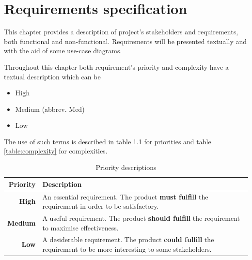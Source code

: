 
\chapter{Requirements specification}

\label{ch:requirements}

This chapter provides a description of project's stakeholders and requirements, both
functional and non-functional. Requirements will be presented textually and with the aid of
some use-case diagrams.

Throughout this chapter both requirement's priority and complexity have a textual description which can be
\begin{itemize}
\item High
\item Medium (abbrev. Med)
\item Low
\end{itemize}

The use of such terms is described in table \ref{table:priorities} for priorities
and table \ref{table:complexity} for complexities.
\begin{table}[H]
\begin{center}
\begin{tabular}{ | r | p{11.5cm} | }
  \hline
  \textbf{Priority} & \textbf{Description} \\
  \hline\noalign{\smallskip}\noalign{\smallskip}\hline
  \textbf{High} & An essential requirement.\newline
  The product \textbf{must fulfill} the requirement in order to be satisfactory. \\
  \textbf{Medium} & A useful requirement.\newline
  The product \textbf{should fulfill} the requirement to maximise effectiveness. \\
  \textbf{Low} & A desiderable requirement.\newline
  The product \textbf{could fulfill} the requirement to be more interesting to some stakeholders. \\
  \hline
\end{tabular}
\end{center}
\caption{Priority descriptions}
\label{table:priorities}
\end{table}

